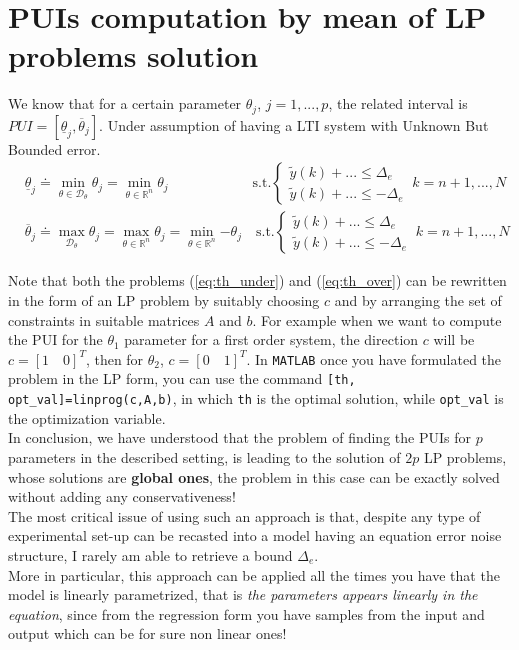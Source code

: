 \section{PUIs computation by mean of LP problems solution} 
We know that for a certain parameter $\theta_j$, $j=1,...,p$,  the related interval is $PUI=[\underline{\theta}_j, \overline{\theta}_j]$. Under assumption of having a LTI system with Unknown But Bounded error.
\begin{align}
    \label{eq:th_under}
    &\underline{\theta}_j \doteq \min_{\theta\in\mathcal{D}_\theta} \theta_j= \min_{\theta\in\mathbb{R}^n} \theta_j 
    \qquad \qquad \qquad  \text{s.t.} \begin{cases}
        \tilde{y}(k)+... \le \Delta_e\\
        \tilde{y}(k)+... \le -\Delta_e
    \end{cases} \ k=n+1, ..., N\\
    \label{eq:th_over}
    &\overline{\theta}_j \doteq \max_{\mathcal{D}_\theta} {\theta_j} = \max_{\theta\in\mathbb{R}^n} {\theta_j}=\min_{\theta\in\mathbb{R}^n} {-\theta_j} 
    \quad  \text{s.t.} \begin{cases}
        \tilde{y}(k)+... \le \Delta_e\\
        \tilde{y}(k)+... \le -\Delta_e
    \end{cases} \ k=n+1, ..., N
\end{align}

\noindent
Note that both the problems (\ref{eq:th_under}) and (\ref{eq:th_over}) can be rewritten in the form of an LP problem by suitably choosing $c$ and by arranging the set of constraints in suitable matrices $A$ and $b$. For example when we want to compute the PUI for the $\theta_1$ parameter for a first order system, the direction $c$ will be $c=[1 \quad 0]^T$, then for $\theta_2$, $c=[0 \quad 1]^T$. In \texttt{MATLAB} once you have formulated the problem in the LP form, you can use the command \texttt{[th, opt\_val]=linprog(c,A,b)}, in which \texttt{th} is the optimal solution, while \texttt{opt\_val} is the optimization variable.\\
In conclusion, we have understood that the problem of finding the PUIs for $p$ parameters in the described setting, is leading to the solution of $2p$ LP problems, whose solutions are \textbf{global ones}, the problem in this case can be exactly solved without adding any conservativeness!\\

\noindent
The most critical issue of using such an approach is that, despite any type of experimental set-up can be recasted into a model having an equation error noise structure, I rarely am able to retrieve a bound $\Delta_e$. \\
{\color{blue}
More in particular, this approach can be applied all the times you have that the model is linearly parametrized, that is \textit{the parameters appears linearly in the equation}, since from the regression form you have samples from the input and output which can be for sure non linear ones! 
}


